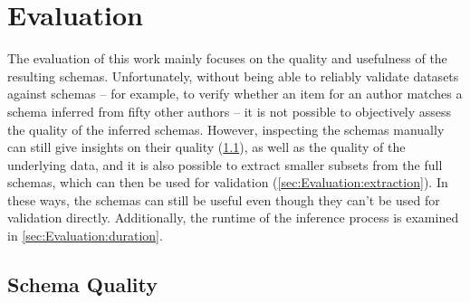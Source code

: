 
\chapter{Evaluation}
\label{ch:Evaluation}

The evaluation of this work
mainly focuses on the quality and usefulness of the resulting schemas.
Unfortunately, without being able to reliably validate datasets against schemas –
for example, to verify whether an item for an author
matches a schema inferred from fifty other authors –
it is not possible to objectively assess the quality of the inferred schemas.
However, inspecting the schemas manually
can still give insights on their quality (\cref{sec:Evaluation:quality}),
as well as the quality of the underlying data,
and it is also possible to extract smaller subsets from the full schemas,
which can then be used for validation (\cref{sec:Evaluation:extraction}).
In these ways, the schemas can still be useful even though they can’t be used for validation directly.
Additionally, the runtime of the inference process is examined in \cref{sec:Evaluation:duration}.

\section{Schema Quality}
\label{sec:Evaluation:quality}

